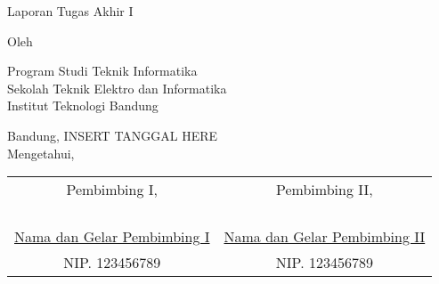 \clearpage
\pagestyle{empty}

\begin{center}
    \smallskip
    
    \Large \bfseries \MakeUppercase{\thetitle}
    \vfill
    
    \Large Laporan Tugas Akhir I
    \vfill
    
    \large Oleh
    
    \Large \theauthor
    
    \large Program Studi Teknik Informatika \\
    
    \normalsize \normalfont
    Sekolah Teknik Elektro dan Informatika \\
    Institut Teknologi Bandung
    
    \vfill
    \normalsize \normalfont
    Bandung, {{INSERT TANGGAL HERE}} \\
    Mengetahui,
    
    \vspace{0.5cm}
    \setlength{\tabcolsep}{12pt}
    \begin{tabular}{c@{\hskip 0.5in}c}
        Pembimbing I,                           & Pembimbing II,                           \\
                                                &                                          \\
                                                &                                          \\
                                                &                                          \\
                                                &                                          \\
        \underline{Nama dan Gelar Pembimbing I} & \underline{Nama dan Gelar Pembimbing II} \\
        NIP. 123456789                          & NIP. 123456789                           \\
    \end{tabular}
    
\end{center}
\clearpage
